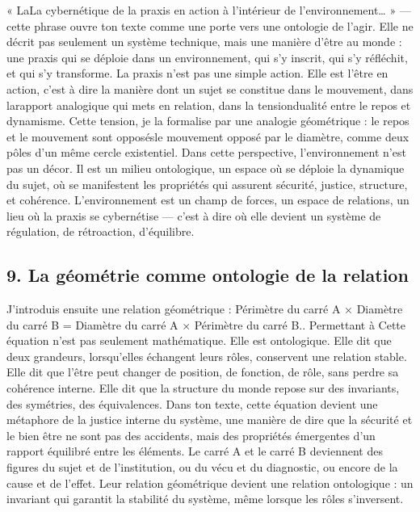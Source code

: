 \documentclass[12pt,letterpaper,oneside]{article}
\begin{document}
« LaLa cybernétique de la praxis en action à l’intérieur de l’environnement… » — cette phrase ouvre ton texte comme une porte vers une ontologie de l’agir. Elle ne décrit pas seulement un système technique, mais une manière d’être au monde : une praxis qui se déploie dans un environnement, qui s’y inscrit, qui s’y réfléchit, et qui s’y transforme.
La praxis n’est pas une simple action. Elle est l’être en action, c’est à dire la manière dont un sujet se constitue dans le mouvement, dans larapport analogique qui mets en relation, dans la tensiondualité entre le repos et dynamisme. Cette tension, je la formalise par une analogie géométrique : le repos et le mouvement sont opposésle mouvement opposé par le diamètre, comme deux pôles d’un même cercle existentiel.
Dans cette perspective, l’environnement n’est pas un décor. Il est un milieu ontologique, un espace où se déploie la dynamique du sujet, où se manifestent les propriétés qui assurent sécurité, justice, structure, et cohérence. L’environnement est un champ de forces, un espace de relations, un lieu où la praxis se cybernétise — c’est à dire où elle devient un système de régulation, de rétroaction, d’équilibre.

\subsection*{9. La géométrie comme ontologie de la relation}
J’introduis ensuite une relation géométrique :
Périmètre du carré A × Diamètre du carré B = Diamètre du carré A × Périmètre du carré B.. Permettant à
Cette équation n’est pas seulement mathématique. Elle est ontologique.
Elle dit que deux grandeurs, lorsqu’elles échangent leurs rôles, conservent une relation stable. Elle dit que l’être peut changer de position, de fonction, de rôle, sans perdre sa cohérence interne. Elle dit que la structure du monde repose sur des invariants, des symétries, des équivalences.
Dans ton texte, cette équation devient une métaphore de la justice interne du système, une manière de dire que la sécurité et le bien être ne sont pas des accidents, mais des propriétés émergentes d’un rapport équilibré entre les éléments.
Le carré A et le carré B deviennent des figures du sujet et de l’institution, ou du vécu et du diagnostic, ou encore de la cause et de l’effet. Leur relation géométrique devient une relation ontologique : un invariant qui garantit la stabilité du système, même lorsque les rôles s’inversent.
\end{document}
